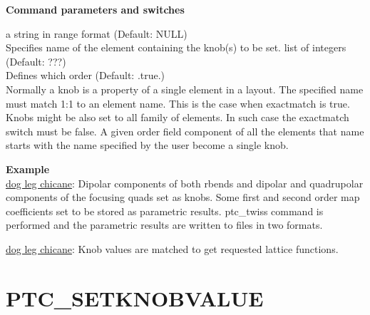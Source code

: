 {\bf Command parameters and switches}
\begin{madlist}
    a string in range format (Default: NULL)\\
     Specifies name of the element containing the knob(s) to be set.   
    list of integers (Default: ???)\\
     Defines which order 
    (Default: .true.)\\
     Normally a knob is a property of a single element in a layout.
     The specified name must match 1:1 to an element name. This is the
     case when exactmatch is true.\\  
     Knobs might be also set to all family of elements. In such case
     the exactmatch switch must be false. A given order field
     component of all the elements that name starts with the
     name specified by the user become a single knob.
\end{madlist}


{\bf Example}\\
\href{http://cern.ch/frs/mad-X_examples/ptc_madx_interface/knobs/knobs.madx}{dog
  leg chicane}: Dipolar components of both rbends and dipolar and
quadrupolar components of the focusing quads set as knobs. Some first
and second order map coefficients set to be stored as parametric
results. ptc\_twiss command is performed and the parametric results are
written to files in two formats. 

\href{http://cern.ch/frs/mad-X_examples/ptc_madx_interface/matchknobs/matchknobs.madx}{dog
  leg chicane}: Knob values are matched to get requested lattice
functions.  


 
% 



%

\section{PTC\_SETKNOBVALUE}

